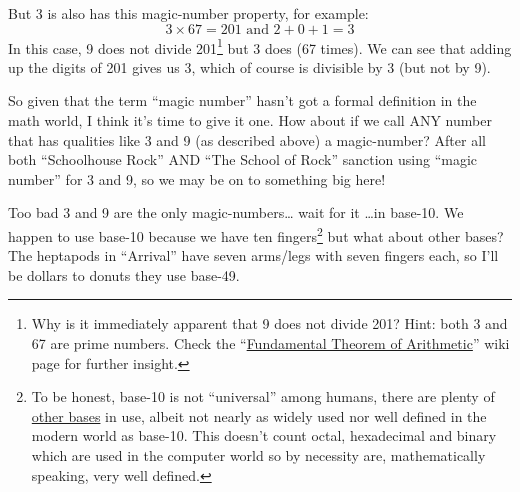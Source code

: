 \documentclass{article}
\newenvironment{jprIn}{\begin{adjustwidth}{2em}{}}{\end{adjustwidth}}
\begin{document}
But 3 is also has this magic-number property, for example:
\[ 3\times{}67=201 \text{ and } 2+0+1=3\]
In this case, 9 does not divide 201\footnote{Why is it immediately
apparent that 9 does not divide 201? Hint: both 3 and 67 are prime numbers.
Check the ``\href{https://en.wikipedia.org/wiki/Fundamental_theorem_of_arithmetic}{Fundamental
Theorem of Arithmetic}'' wiki page for further insight.}
but 3 does (67 times).
We can see that adding up the digits of 201 gives us 3,
which of course is divisible by 3 (but not by 9).

%
%

So given that the term ``magic number'' hasn't got
a formal definition in the math world, I think it's time to give it one.
How about if we call ANY number that has qualities like 3 and 9 (as 
described above) a magic-number?
After all both ``Schoolhouse Rock'' AND ``The School of Rock'' sanction using
``magic number'' for 3 and 9, so we may be on to something big here!

Too bad 3 and 9 are the only magic-numbers\dots{} wait for it \dots{}in base-10.
We happen to use base-10 because we have ten fingers\footnote{To be honest, base-10 is
not ``universal'' among humans, there are plenty of
\href{https://www.youtube.com/watch?v=l4bmZ1gRqCc}{other bases} in use, albeit not nearly
as widely used nor well defined in the modern world as base-10. This doesn't count
octal, hexadecimal and binary which are used in the computer world
so by necessity are, mathematically speaking, very well defined.} but what about other bases?
The heptapods in ``Arrival'' have seven arms/legs with seven fingers each,
so I'll be dollars to donuts they use base-49.
\end{document}
